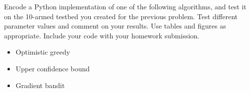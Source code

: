 \documentclass[12pt,letterpaper]{exam}
\begin{document}
\begin{questions}
	\begin{solution}
	
	\end{solution}

	\question%
	Encode a Python implementation of one of the following algorithms, and test it on the 10-armed testbed you created for the previous problem. 
	Test different parameter values and comment on your results. 
	Use tables and figures as appropriate. Include your code with your homework submission.
	\begin{itemize}
		\item Optimistic greedy
		\item Upper confidence bound 
		\item Gradient bandit
	\end{itemize}
	
	\begin{solution}
	
	\end{solution}


\end{questions}
\end{document}
